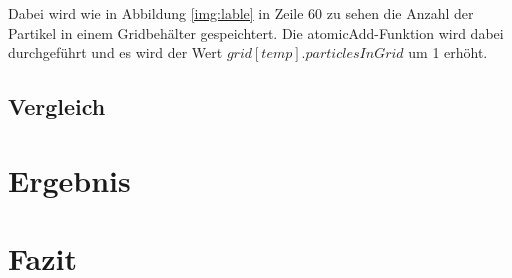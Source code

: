 \documentclass[intern,palatino]{cgBA}
\begin{document}
 Dabei wird wie in Abbildung \ref{img:lable} in Zeile 60 zu sehen die Anzahl der Partikel in einem Gridbehälter gespeichtert. Die atomicAdd-Funktion wird dabei durchgeführt und es wird der Wert $grid[temp].particlesInGrid$ um 1 erhöht. 


\subsection{Vergleich}\label{vergleich}


\section{Ergebnis}\label{ergebnis}


\section{Fazit}\label{fazit}



\newpage
\listoffigures
\newpage

\end{document}
